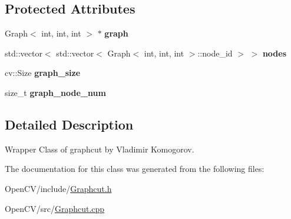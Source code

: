 \subsection*{Protected Attributes}
\begin{DoxyCompactItemize}
\item 
\hypertarget{classskl_1_1_graphcut_ae41c06b9e782bd69d2633760c32cfc53}{}\label{classskl_1_1_graphcut_ae41c06b9e782bd69d2633760c32cfc53} 
Graph$<$ int, int, int $>$ $\ast$ {\bfseries graph}
\item 
\hypertarget{classskl_1_1_graphcut_a3dfcbf111a5d66f386d4ee6b5daccc77}{}\label{classskl_1_1_graphcut_a3dfcbf111a5d66f386d4ee6b5daccc77} 
std\+::vector$<$ std\+::vector$<$ Graph$<$ int, int, int $>$\+::node\+\_\+id $>$ $>$ {\bfseries nodes}
\item 
\hypertarget{classskl_1_1_graphcut_acc37076a1fb4ed536fd0ba089f019b20}{}\label{classskl_1_1_graphcut_acc37076a1fb4ed536fd0ba089f019b20} 
cv\+::\+Size {\bfseries graph\+\_\+size}
\item 
\hypertarget{classskl_1_1_graphcut_a2438ccbecf54676accbda142f0c641ea}{}\label{classskl_1_1_graphcut_a2438ccbecf54676accbda142f0c641ea} 
size\+\_\+t {\bfseries graph\+\_\+node\+\_\+num}
\end{DoxyCompactItemize}


\subsection{Detailed Description}
Wrapper Class of graphcut by Vladimir Komogorov. 

The documentation for this class was generated from the following files\+:\begin{DoxyCompactItemize}
\item 
Open\+C\+V/include/\hyperlink{_graphcut_8h}{Graphcut.\+h}\item 
Open\+C\+V/src/\hyperlink{_graphcut_8cpp}{Graphcut.\+cpp}\end{DoxyCompactItemize}
